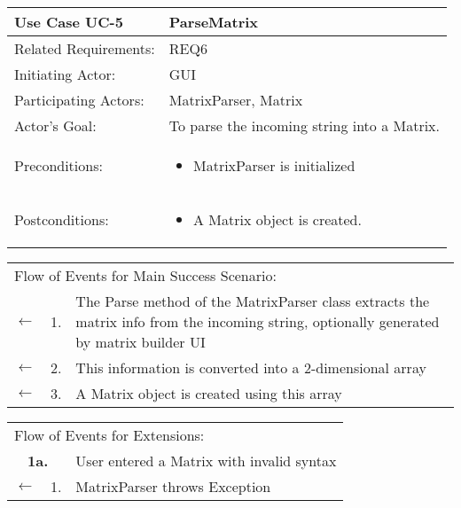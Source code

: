 \documentclass[11pt]{article}
\begin{document}
\newpage
\begin{center}
\begin{tabular}{p{1.5in}p{5in}}
\hline
\textbf{Use Case UC-5}     & \textbf{ParseMatrix} \\ \hline
Related Requirements: & REQ6 \\
Initiating Actor:     & GUI \\
Participating Actors: &MatrixParser, Matrix \\
Actor's Goal:          & To parse the incoming string into a Matrix. \\
Preconditions:         & \begin{itemize}[nosep]
		      \item  MatrixParser is initialized
                         \end{itemize} \\
Postconditions:        & \begin{itemize}[nosep]
                         \item A Matrix object is created.
                         \end{itemize} \\ \hline
\end{tabular}

\begin{tabular}{p{.25in}p{.25in}p{5.8in}}
\multicolumn{3}{l}{Flow of Events for Main Success Scenario:} \\
$\leftarrow$  & 1. & The Parse method of the MatrixParser class extracts the matrix info from the incoming string, optionally generated by matrix builder UI\\
$\leftarrow$  & 2. & This information is converted into a 2-dimensional array\\
$\leftarrow$ & 3.& A Matrix object is created using this array\\
\end{tabular}

\begin{tabular}{p{.25in}p{.25in}p{5.8in}}
\multicolumn{3}{l}{Flow of Events for Extensions:} \\
\multicolumn{2}{c}{\textbf{1a.}} & User entered a Matrix with invalid syntax \\
$\leftarrow$  & 1.           & MatrixParser throws Exception\\


\end{tabular}
\end{center}
\end{document}
